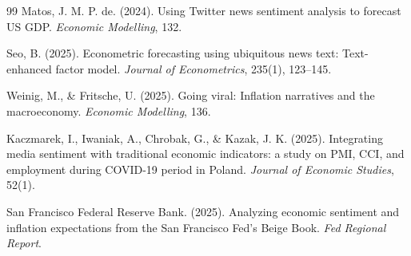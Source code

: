 \documentclass[11pt]{article}
\begin{document}
\begin{thebibliography}{99}
 Matos, J. M. P. de. (2024). Using Twitter news sentiment analysis to forecast US GDP. \textit{Economic Modelling}, 132.

 Seo, B. (2025). Econometric forecasting using ubiquitous news text: Text-enhanced factor model. \textit{Journal of Econometrics}, 235(1), 123--145.

 Weinig, M., \& Fritsche, U. (2025). Going viral: Inflation narratives and the macroeconomy. \textit{Economic Modelling}, 136.

 Kaczmarek, I., Iwaniak, A., Chrobak, G., \& Kazak, J. K. (2025). Integrating media sentiment with traditional economic indicators: a study on PMI, CCI, and employment during COVID-19 period in Poland. \textit{Journal of Economic Studies}, 52(1).

 San Francisco Federal Reserve Bank. (2025). Analyzing economic sentiment and inflation expectations from the San Francisco Fed's Beige Book. \textit{Fed Regional Report}.

\end{thebibliography}
\end{document}
